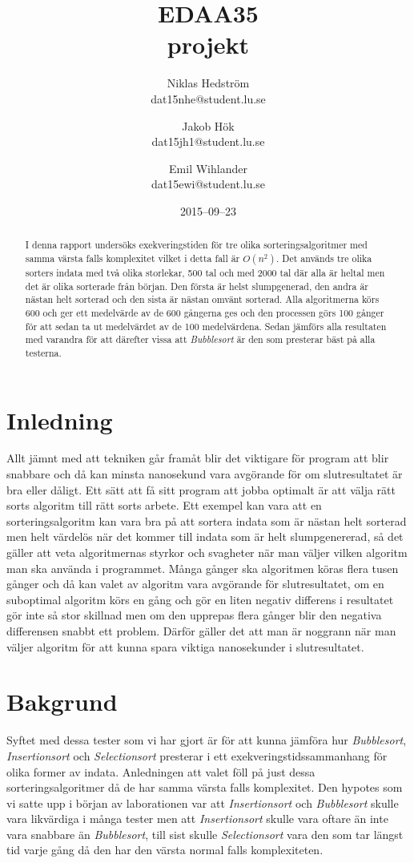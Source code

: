 \documentclass[a4paper]{article}
\title{EDAA35\\ projekt}
\author{Niklas Hedström \\dat15nhe@student.lu.se\and
	    Jakob Hök \\ dat15jh1@student.lu.se \and
	    Emil Wihlander\\ dat15ewi@student.lu.se}
\date{2015--09--23}
\begin{document}
\maketitle

\begin{abstract}
	I denna rapport undersöks exekveringstiden för tre olika sorteringsalgoritmer med samma värsta falls komplexitet vilket i detta fall är $O(n^2)$. Det används tre olika sorters indata med två olika storlekar, 500 tal och med 2000 tal där alla är heltal men det är olika sorterade från början. Den första är helst slumpgenerad, den andra är nästan helt sorterad och den sista är nästan omvänt sorterad. Alla algoritmerna körs 600 och ger ett medelvärde av de 600 gångerna ges och den processen görs 100 gånger för att sedan ta ut medelvärdet av de 100 medelvärdena. Sedan jämförs alla resultaten med varandra för att därefter vissa att \emph{Bubblesort} är den som presterar bäst på alla testerna.
\end{abstract}

\pagebreak

\section{Inledning}
Allt jämnt med att tekniken går framåt blir det viktigare för program att blir snabbare och då kan minsta nanosekund vara avgörande för om slutresultatet är bra eller dåligt. Ett sätt att få sitt program att jobba optimalt är att välja rätt sorts algoritm till rätt sorts arbete. Ett exempel kan vara att en sorteringsalgoritm kan vara bra på att sortera indata som är nästan helt sorterad men helt värdelös när det kommer till indata som är helt slumpgenererad, så det gäller att veta algoritmernas styrkor och svagheter när man väljer vilken algoritm man ska använda i programmet. Många gånger ska algoritmen köras flera tusen gånger och då kan valet av algoritm vara avgörande för slutresultatet, om en suboptimal algoritm körs en gång och gör en liten negativ differens i resultatet gör inte så stor skillnad men om den upprepas flera gånger blir den negativa differensen snabbt ett problem. Därför gäller det att man är noggrann när man väljer algoritm för att kunna spara viktiga nanosekunder i slutresultatet. 

\section{Bakgrund}
Syftet med dessa tester som vi har gjort är för att kunna jämföra hur \emph{Bubblesort}, \emph{Insertionsort} och \emph{Selectionsort} presterar i ett exekveringstidssammanhang för olika former av indata. Anledningen att valet föll på just dessa sorteringsalgoritmer då de har samma värsta falls komplexitet. Den hypotes som vi satte upp i början av laborationen var att \emph{Insertionsort} och \emph{Bubblesort} skulle vara likvärdiga i många tester men att \emph{Insertionsort} skulle vara oftare än inte vara snabbare än \emph{Bubblesort}, till sist skulle \emph{Selectionsort} vara den som tar längst tid varje gång då den har den värsta normal falls komplexiteten.\cite{sortingAlgoritm}
\end{document}
